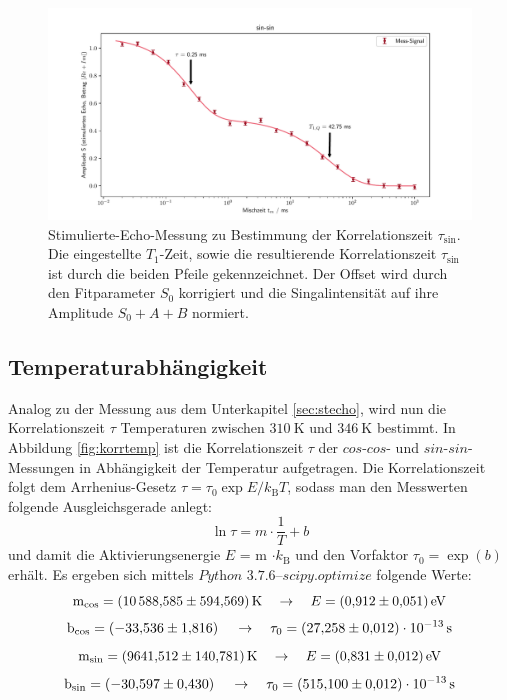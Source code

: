 \begin{figure}[H]
    \centering
    \includegraphics[width=\textwidth]{Auswertung/Para_der_Korrfkt/sin_sin.pdf}
    \caption{Stimulierte-Echo-Messung zu Bestimmung der Korrelationszeit
    $\tau_{\text{sin}}$. Die eingestellte $T_1$-Zeit, sowie die resultierende
    Korrelationszeit $\tau_{\text{sin}}$ ist durch die beiden Pfeile gekennzeichnet.
    Der Offset wird durch den Fitparameter $S_0$ korrigiert und die
    Singalintensität auf ihre Amplitude $S_0+A+B$ normiert.}
    \label{fig:sin-sin}
\end{figure}

\subsection{Temperaturabhängigkeit}
\label{sec:tempabh}
Analog zu der Messung aus dem Unterkapitel \ref{sec:stecho}, wird nun die
Korrelationszeit $\tau$ Temperaturen zwischen $\SI{310}{\kelvin}$
und $\SI{346}{\kelvin}$ bestimmt. In Abbildung \ref{fig:korrtemp}
ist die Korrelationszeit $\tau$ der $cos$-$cos$- und $sin$-$sin$-Messungen
in Abhängigkeit der Temperatur aufgetragen. Die Korrelationszeit folgt
dem Arrhenius-Gesetz $\tau = \tau_0 \exp{E/k_{\text{B}}T}$, sodass man den Messwerten
folgende Ausgleichsgerade anlegt:
\begin{equation*}
  \ln{\tau} = m \cdot \frac{1}{T} + b
\end{equation*}
\noindent
und damit die Aktivierungsenergie $E$ = m $\cdot k_{\text{B}}$ und den Vorfaktor $\tau_0 = \exp{(b)}$ erhält. Es ergeben sich mittels
$\textit{Python 3.7.6--scipy.optimize}$ folgende Werte:
\begin{equation*}
  \text{m}_{\text{cos}} = \SI{10588,585\pm594,569}{\kelvin}
  \quad\rightarrow\quad
  E = \SI{0.912\pm0.051}{\electronvolt}
\end{equation*}
\begin{equation*}
  \text{b}_{\text{cos}} = \SI{-33,536\pm1,816}
  \quad\rightarrow\quad
  \tau_0 = \SI{27,258\pm0.012 e-13}{\second}
\end{equation*}
\begin{equation*}
  \text{m}_{\text{sin}} = \SI{9641,512\pm140,781}{\kelvin}
  \quad\rightarrow\quad
  E = \SI{0.831\pm0.012}{\electronvolt}
\end{equation*}
\begin{equation*}
  \text{b}_{\text{sin}} = \SI{-30,597\pm0.430}
  \quad\rightarrow\quad
  \tau_0 = \SI{515,100\pm0.012 e-13}{\second}
\end{equation*}

